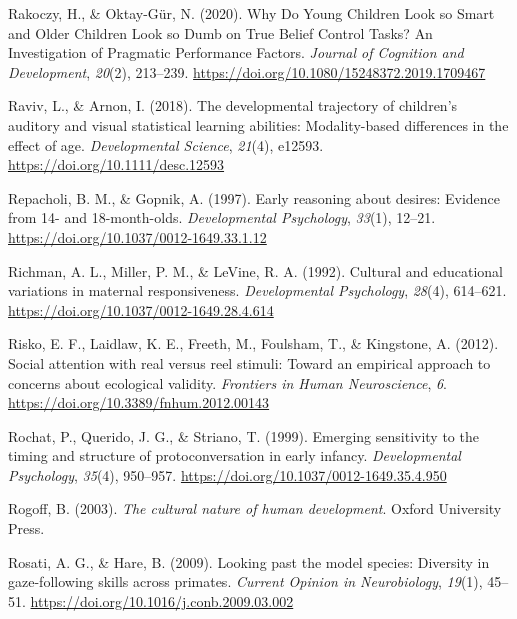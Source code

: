 \documentclass[
]{scrbook}
\newlength{\cslhangindent}
\newenvironment{CSLReferences}[2] %
 {\begin{list}{}{%
  \setlength{\itemindent}{0pt}
  \setlength{\leftmargin}{0pt}
  \setlength{\parsep}{0pt}
  \ifodd #1
   \setlength{\leftmargin}{\cslhangindent}
   \setlength{\itemindent}{-1\cslhangindent}
  \fi
  \setlength{\itemsep}{#2\baselineskip}}}
 {\end{list}}
\begin{document}
\begin{CSLReferences}{1}{0}
Rakoczy, H., \& Oktay-Gür, N. (2020). Why {Do Young Children Look} so {Smart} and {Older Children Look} so {Dumb} on {True Belief Control Tasks}? {An Investigation} of {Pragmatic Performance Factors}. \emph{Journal of Cognition and Development}, \emph{20}(2), 213--239. \url{https://doi.org/10.1080/15248372.2019.1709467}

Raviv, L., \& Arnon, I. (2018). The developmental trajectory of children's auditory and visual statistical learning abilities: Modality-based differences in the effect of age. \emph{Developmental Science}, \emph{21}(4), e12593. \url{https://doi.org/10.1111/desc.12593}

Repacholi, B. M., \& Gopnik, A. (1997). Early reasoning about desires: {Evidence} from 14- and 18-month-olds. \emph{Developmental Psychology}, \emph{33}(1), 12--21. \url{https://doi.org/10.1037/0012-1649.33.1.12}

Richman, A. L., Miller, P. M., \& LeVine, R. A. (1992). Cultural and educational variations in maternal responsiveness. \emph{Developmental Psychology}, \emph{28}(4), 614--621. \url{https://doi.org/10.1037/0012-1649.28.4.614}

Risko, E. F., Laidlaw, K. E., Freeth, M., Foulsham, T., \& Kingstone, A. (2012). Social attention with real versus reel stimuli: Toward an empirical approach to concerns about ecological validity. \emph{Frontiers in Human Neuroscience}, \emph{6}. \url{https://doi.org/10.3389/fnhum.2012.00143}

Rochat, P., Querido, J. G., \& Striano, T. (1999). Emerging sensitivity to the timing and structure of protoconversation in early infancy. \emph{Developmental Psychology}, \emph{35}(4), 950--957. \url{https://doi.org/10.1037/0012-1649.35.4.950}

Rogoff, B. (2003). \emph{The cultural nature of human development}. Oxford University Press.

Rosati, A. G., \& Hare, B. (2009). Looking past the model species: Diversity in gaze-following skills across primates. \emph{Current Opinion in Neurobiology}, \emph{19}(1), 45--51. \url{https://doi.org/10.1016/j.conb.2009.03.002}


\end{CSLReferences}
\end{document}
